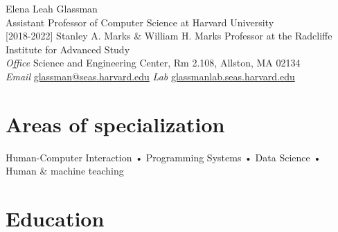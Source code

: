 \documentclass[10pt, a4paper]{article}
\begin{document}
{\LARGE Elena Leah Glassman}\\[0.25cm]
{\large Assistant Professor of Computer Science at Harvard University\\ [0.1cm]
[2018-2022] Stanley A. Marks \& William H. Marks Professor at the Radcliffe Institute for Advanced Study}\\[0.5cm]
\textit{Office} Science and Engineering Center, Rm 2.108, Allston, MA 02134\\%
\textit{Email} \href{mailto:glassman@seas.harvard.edu}{glassman@seas.harvard.edu} \textit{Lab} \href{http://glassmanlab.seas.harvard.edu/}{glassmanlab.seas.harvard.edu}

\section*{Areas of specialization}
Human-Computer Interaction • Programming Systems • Data Science • Human \& machine teaching  



\section*{Education}
\noindent
\end{document}

